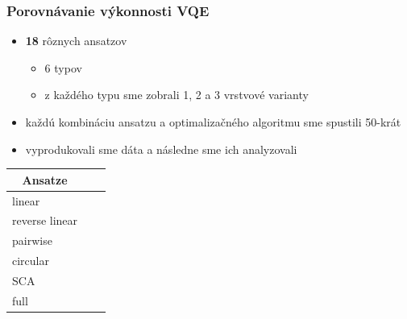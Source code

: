 \documentclass{beamer}
\begin{document}
\begin{frame}
    \frametitle{Porovnávanie výkonnosti VQE}
	\begin{itemize}
        \item \textbf{18} rôznych ansatzov
        \begin{itemize}
            \item 6 typov
            \item z každého typu sme zobrali 1, 2 a 3 vrstvové varianty
        \end{itemize} 
        \item každú kombináciu ansatzu a optimalizačného algoritmu sme spustili 50-krát
        \item vyprodukovali sme dáta a následne sme ich analyzovali
    \end{itemize}
		
            \begin{table}[H]
                \centering
                \begin{tabular}{|l|c|c|} 
                    \hline
                    \multicolumn{1}{|c|}{\textbf{Ansatze}}\\
                    \hline
                    linear \\ 
                    \hline
                    reverse linear \\ 
                    \hline
                    pairwise \\ 
                    \hline
                    circular \\ 
                    \hline
                    SCA \\ 
                    \hline
                    full \\ 
                    \hline
                \end{tabular}
            \end{table}
\end{frame}
\end{document}
